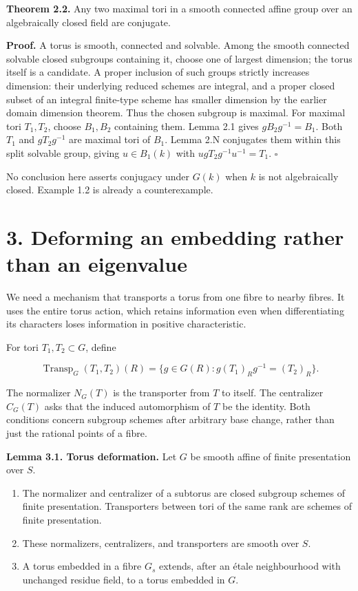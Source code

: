 \documentclass[11pt,a4paper,openany]{report}
\providecommand{\tightlist}{\setlength{\itemsep}{0pt}\setlength{\parskip}{0pt}}
\begin{document}
\textbf{Theorem 2.2.} Any two maximal tori in a smooth connected affine group over an algebraically closed field are conjugate.

\textbf{Proof.} A torus is smooth, connected and solvable. Among the smooth connected solvable closed subgroups containing it, choose one of largest dimension; the torus itself is a candidate. A proper inclusion of such groups strictly increases dimension: their underlying reduced schemes are integral, and a proper closed subset of an integral finite-type scheme has smaller dimension by the earlier domain dimension theorem. Thus the chosen subgroup is maximal. For maximal tori \(T_1,T_2\), choose \(B_1,B_2\) containing them. Lemma 2.1 gives \(gB_2g^{-1}=B_1\). Both \(T_1\) and \(gT_2g^{-1}\) are maximal tori of \(B_1\). Lemma 2.N conjugates them within this split solvable group, giving \(u\in B_1(k)\) with \(u gT_2g^{-1}u^{-1}=T_1\). \(\square\)

No conclusion here asserts conjugacy under \(G(k)\) when \(k\) is not algebraically closed. Example 1.2 is already a counterexample.

\section{3. Deforming an embedding rather than an eigenvalue}\label{AG-RG-01-deforming-an-embedding-rather-than-an-eigenvalue}

We need a mechanism that transports a torus from one fibre to nearby fibres. It uses the entire torus action, which retains information even when differentiating its characters loses information in positive characteristic.

For tori \(T_1,T_2\subset G\), define

\[
\operatorname{Transp}_G(T_1,T_2)(R)
=\{g\in G(R):g(T_1)_R g^{-1}=(T_2)_R\}.
\]

The normalizer \(N_G(T)\) is the transporter from \(T\) to itself. The centralizer \(C_G(T)\) asks that the induced automorphism of \(T\) be the identity. Both conditions concern subgroup schemes after arbitrary base change, rather than just the rational points of a fibre.

\textbf{Lemma 3.1. Torus deformation.} Let \(G\) be smooth affine of finite presentation over \(S\).

\begin{enumerate}
\def\labelenumi{\arabic{enumi}.}
\tightlist
\item
  The normalizer and centralizer of a subtorus are closed subgroup schemes of finite presentation. Transporters between tori of the same rank are schemes of finite presentation.
\item
  These normalizers, centralizers, and transporters are smooth over \(S\).
\item
  A torus embedded in a fibre \(G_s\) extends, after an étale neighbourhood with unchanged residue field, to a torus embedded in \(G\).
\end{enumerate}
\end{document}
